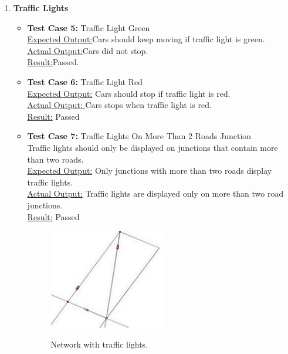 \documentclass[11pt]{article}
\begin{document}
\begin{enumerate}
\begin{itemize}
\begin{enumerate}
\item \textbf{Traffic Lights}
	\begin{itemize}
		\item \textbf{Test Case 5:} Traffic Light Green \hfill \\
		\underline {Expected Output:}Cars should keep moving if traffic light is green.\hfill \\
		\underline{ Actual Output:}Cars did not stop.\hfil \\
		\underline{ Result:}Passed.

		\item \textbf{Test Case 6:} Traffic Light Red\hfill \\
		 \underline{Expected Output:} Cars should stop if traffic light is red.\hfill \\
		\underline{ Actual Output: }Cars stops when traffic light is red.\hfill \\
		 \underline{Result:} Passed
 
		 \item \textbf{Test Case 7:} Traffic Lights On More Than 2 Roads Junction\hfill \\
 		Traffic lights should only be displayed on junctions that contain more than two roads.\hfill \\
 		\underline{Expected Output:} Only junctions with more than two roads display traffic lights.\hfill \\
		\underline{Actual Output:} Traffic lights are displayed only on more than two road junctions.\hfill \\
		\underline{Result:} Passed\hfill \\

		\begin{figure}[h!]
		 \centering
		\includegraphics{junction}\hfill \\
 		\caption{Network with traffic lights.}
		\end{figure}
	\end{itemize}

 \end{enumerate}


\end{itemize}
\end{enumerate}
\end{document}
